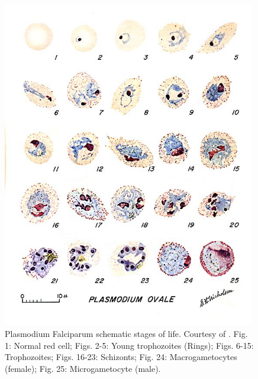 \documentclass[final,a4paper,12pt,english]{UnicaPhdThesis3}
\begin{document}
{\begin{figure}[!htbp]
	\centering
	\includegraphics[width=0.98\textwidth]{images/malaria_th/mal_ova}
	\caption{\label{fig:ova_th} Plasmodium Falciparum schematic stages of life. Courtesy of \cite{Med_cdc}.
	Fig. 1: Normal red cell; Figs. 2-5: Young trophozoites (Rings); Figs. 6-15: Trophozoites; 
	Figs. 16-23: Schizonts; Fig. 24: Macrogametocytes (female); Fig. 25: Microgametocyte (male).}
\end{figure}

}
\end{document}
